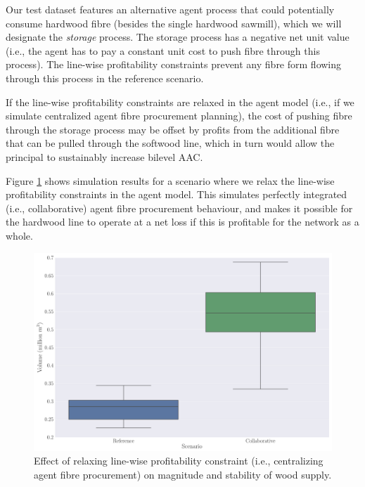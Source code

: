 Our test dataset features an alternative agent process that could potentially consume hardwood fibre (besides the single hardwood sawmill), which we will designate the \emph{storage} process. The storage process has a negative net unit value (i.e., the agent has to pay a constant unit cost to push fibre through this process). The line-wise profitability constraints prevent any fibre form flowing through this process in the reference scenario. 

If the line-wise profitability constraints are relaxed in the agent model (i.e., if we simulate centralized agent fibre procurement planning), the cost of pushing fibre through the storage process may be offset by profits from the additional fibre that can be pulled through the softwood line, which in turn would allow the principal to sustainably increase bilevel AAC. 

Figure \ref{fig:scenario_series_0} shows simulation results for a scenario where we relax the line-wise profitability constraints in the agent model.  This simulates perfectly integrated (i.e., collaborative) agent fibre procurement behaviour, and makes it possible for the hardwood line to operate at a net loss if this is profitable for the network as a whole. 

\begin{figure}[H]
  \centering
  \includegraphics[width=\textwidth]{images/boxplots_series0}
  \caption{Effect of relaxing line-wise profitability constraint (i.e., centralizing agent fibre procurement) on magnitude and stability of wood supply. }
  \label{fig:scenario_series_0}
\end{figure}



